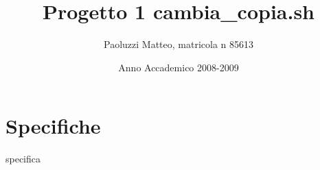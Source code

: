\documentclass[a4paper,10pt]{report}
\begin{document}
	\title{Progetto 1 cambia\_copia.sh}
	\author{Paoluzzi Matteo, matricola n 85613}
	\date{Anno Accademico 2008-2009}
	\begin{titlepage}
		\maketitle
	\end{titlepage}
	\nopagebreak
	\tableofcontents
	\newpage
	\part{Specifiche}
		specifica
\end{document}
